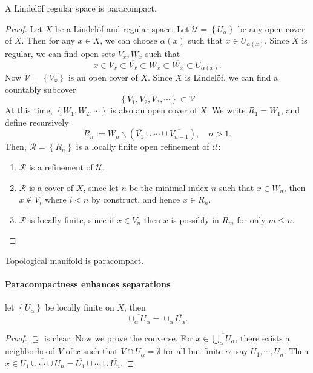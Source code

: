\begin{proposition}
  A Lindel\"{o}f regular space is paracompact.
\end{proposition}
\begin{proof}
  Let \( X \) be a Lindel\"{o}f and regular space.
  Let \( \mathcal{U} = \left\lbrace U_\alpha \right\rbrace \) be any open cover of \( X \).
  Then for any \( x \in X \), we can choose \( \alpha(x) \) such that \( x \in U_{\alpha(x)} \).
  Since \( X \) is regular, we can find open sets \( V_x, W_x \) such that
  \[
    x \in V_x \subset \overline{V_x} \subset W_x \subset \overline{W_x} \subset U_{\alpha(x)}.
  \]
  Now \( \mathcal{V} = \left\lbrace V_x \right\rbrace \) is an open cover of \( X \).
  Since \( X \) is Lindel\"{o}f, we can find a countably subcover
  \[
    \left\lbrace V_1, V_2, V_3, \cdots \right\rbrace \subset \mathcal{V}
  \]
  At this time, \( \left\lbrace W_1, W_2, \cdots \right\rbrace \) is also an open cover of \( X \).
  We write \( R_1 = W_1 \), and define recursively
  \[
    R_n := W_n \backslash (\overline{V_1} \cup \cdots \cup \overline{V_{n - 1}}), \quad n > 1.
  \]
  Then, \( \mathcal{R} = \left\lbrace R_n \right\rbrace \) is a locally finite open refinement of \( \mathcal{U} \):
  \begin{enumerate}
    \item \( \mathcal{R} \) is a refinement of \( \mathcal{U} \).
    \item \( \mathcal{R} \) is a cover of \( X \), since let \( n \) be the minimal index \( n \) such that \( x \in W_n \), then \( x \notin V_i \) where \( i < n \) by construct, and hence \( x \in R_n \).
    \item \( \mathcal{R} \) is locally finite, since if \( x \in V_n \) then \( x \) is possibly in \( R_m \) for only \( m \leq n \).
  \end{enumerate}
\end{proof}

\begin{corollary}
  Topological manifold is paracompact.
\end{corollary}

\paragraph{Paracompactness enhances separations}

\begin{lemma}
  let \( \left\lbrace U_\alpha \right\rbrace \) be locally finite on \( X \), then
  \[
    \overline{\cup_{\alpha} U_\alpha} = \cup_{\alpha} \overline{U_\alpha}.
  \]
\end{lemma}
\begin{proof}
  \( \supseteq \) is clear.
  Now we prove the converse.
  For \( x \in \overline{\bigcup_\alpha U_\alpha} \), there exists a neighborhood \( V \) of \( x \) such that \( V \cap U_\alpha = \emptyset \) for all but finite \( \alpha \), say \( U_1, \cdots, U_n \).
  Then \( x \in \overline{U_1 \cup \cdots \cup U_n} = \overline{U_1} \cup \cdots \cup \overline{U_n}  \).
\end{proof}


